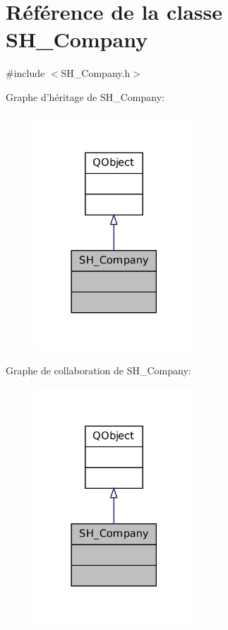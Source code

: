 \hypertarget{classSH__Company}{\section{Référence de la classe S\-H\-\_\-\-Company}
\label{classSH__Company}
}


{\ttfamily \#include $<$S\-H\-\_\-\-Company.\-h$>$}



Graphe d'héritage de S\-H\-\_\-\-Company\-:\nopagebreak
\begin{figure}[H]
\begin{center}
\leavevmode
\includegraphics[width=170pt]{classSH__Company__inherit__graph}
\end{center}
\end{figure}


Graphe de collaboration de S\-H\-\_\-\-Company\-:\nopagebreak
\begin{figure}[H]
\begin{center}
\leavevmode
\includegraphics[width=170pt]{classSH__Company__coll__graph}
\end{center}
\end{figure}


